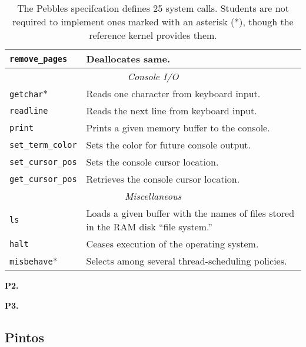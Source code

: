\begin{table}
\begin{tabular}{|l|p{}|}
                \texttt{remove\_pages} & Deallocates same. \\
                \hline
                \multicolumn{2}{c}{\em Console I/O} \\
                \hline
                \texttt{getchar}* & Reads one character from keyboard input. \\
                \texttt{readline} & Reads the next line from keyboard input. \\
                \texttt{print} & Prints a given memory buffer to the console. \\
                \texttt{set\_term\_color} & Sets the color for future console output. \\
                \texttt{set\_cursor\_pos} & Sets the console cursor location. \\
                \texttt{get\_cursor\_pos} & Retrieves the console cursor location. \\
                \hline
                \multicolumn{2}{c}{\em Miscellaneous} \\
                \hline
                \texttt{ls} & Loads a given buffer with the names of files stored in the RAM disk ``file system.'' \\
                \texttt{halt} & Ceases execution of the operating system. \\
                \texttt{misbehave}* & Selects among several thread-scheduling policies. \\
                \hline
        \end{tabular}
        \caption{The Pebbles specifcation defines 25 system calls. Students are not required to implement ones marked with an asterisk (*), though the reference kernel provides them. }
        \label{tab:syscalls}
\end{table}

{\bf P2.}

{\bf P3.}

\subsection{Pintos}
